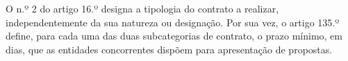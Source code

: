 





O n.º 2 do artigo 16.º designa a tipologia do contrato a realizar, independentemente da sua natureza ou designação. Por sua vez, o artigo 135.º define, para cada uma das duas subcategorias de contrato, o prazo mínimo, em dias, que as entidades concorrentes dispõem para apresentação de propostas. 


